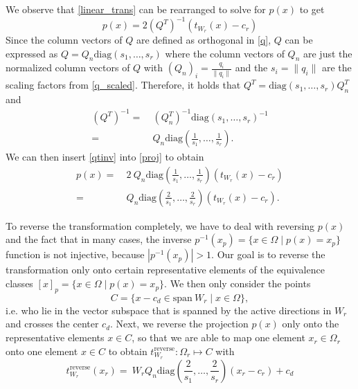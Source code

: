\documentclass[
  a4paper,  %
  twoside,  %
  bibliography=totoc,
  headsepline,
  cleardoublepage=empty,
  parskip=half,
  draft=false
]{scrbook}
\begin{document}
We observe that \cref{linear_trans} can be rearranged to solve for $p(x)$ to get
\begin{equation}
p(x)=2 (Q^T)^{-1} (t_{W_r}(x) - c_r)
\label{proj}
\end{equation}
Since the column vectors of $Q$ are defined as orthogonal in \cref{q}, $Q$ can be expressed as $Q=Q_n \text{diag}\left(s_1, \dots, s_r\right)$ where the column vectors of $Q_n$ are just the normalized column vectors of $Q$ with $(Q_n)_i=\frac{q_i}{\| q_i \|}$ and the $s_i=\| q_i \|$ are the scaling factors from \cref{q_scaled}.
Therefore, it holds that $Q^T=\text{diag}\left(s_1, \dots, s_r\right) Q_n^T$ and
\begin{equation}
\begin{split}
\left(Q^T\right)^{-1}=~&\left(Q_n^T\right)^{-1}  \text{diag}\left(s_1, \dots, s_r\right)^{-1}  \\
=~&Q_n \text{diag}\left(\frac{1}{s_1}, \dots, \frac{1}{s_r}\right) .
\label{qtinv}
\end{split}
\end{equation}
We can then insert \cref{qtinv} into \cref{proj} to obtain
\begin{equation}
\begin{split}
p(x)=&~2 ~ Q_n \text{diag}\left(\frac{1}{s_1}, \dots, \frac{1}{s_r}\right) (t_{W_r}(x) - c_r)\\
=&~Q_n \text{diag}\left(\frac{2}{s_1}, \dots, \frac{2}{s_r}\right)  (t_{W_r}(x) - c_r).
\end{split}
\end{equation}

To reverse the transformation completely, we have to deal with reversing $p(x)$ and the fact that in many cases, the inverse $p^{-1}(x_p)=\{x \in \Omega \mid p(x)=x_{p}\}$ function is not injective, because $|p^{-1}(x_p)| > 1$.
Our goal is to reverse the transformation only onto certain representative elements of the equivalence classes $[x]_p=\{x \in \Omega \mid p(x)=x_{p}\}$.
We then only consider the points
\begin{equation}
C=\{x - c_d  \in \text{span} ~ W_r \mid x \in \Omega\},
\label{proj_rep}
\end{equation}
i.e. who lie in the vector subspace that is spanned by the active directions in $W_r$ and crosses the center $c_d$.
Next, we reverse the projection $p(x)$ only onto the representative elements $x \in C$, so that we are able to map one element $x_r\in \Omega_r$ onto one element $x \in C$ to obtain $t_{W_r}^{\text{reverse}}\colon \Omega_r \mapsto C$ with
\begin{equation}
t_{W_r}^{\text{reverse}}(x_r)=~W_r Q_n \text{diag}\left(\frac{2}{s_1}, \dots, \frac{2}{s_r}\right) (x_r - c_r) + c_d
\end{equation}
\end{document}
